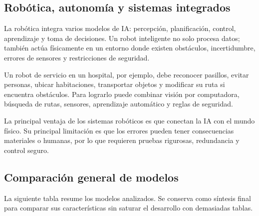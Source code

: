 \subsection{Robótica, autonomía y sistemas integrados}

La robótica integra varios modelos de IA: percepción, planificación, control, aprendizaje y toma de decisiones. Un robot inteligente no solo procesa datos; también actúa físicamente en un entorno donde existen obstáculos, incertidumbre, errores de sensores y restricciones de seguridad.

Un robot de servicio en un hospital, por ejemplo, debe reconocer pasillos, evitar personas, ubicar habitaciones, transportar objetos y modificar su ruta si encuentra obstáculos. Para lograrlo puede combinar visión por computadora, búsqueda de rutas, sensores, aprendizaje automático y reglas de seguridad.

La principal ventaja de los sistemas robóticos es que conectan la IA con el mundo físico. Su principal limitación es que los errores pueden tener consecuencias materiales o humanas, por lo que requieren pruebas rigurosas, redundancia y control seguro.

\subsection{Comparación general de modelos}

La siguiente tabla resume los modelos analizados. Se conserva como síntesis final para comparar sus características sin saturar el desarrollo con demasiadas tablas.

